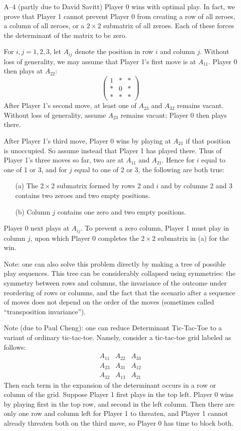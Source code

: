 \documentclass[amssymb,twocolumn,pra,10pt,aps]{revtex4-1}
\begin{document}
\begin{itemize}
\item[A--4]
(partly due to David Savitt)
Player 0 wins with optimal play. In fact, we prove that Player 1 cannot
prevent Player 0 from creating a row of all zeroes, a column of all
zeroes, or a $2 \times 2$ submatrix of all zeroes. Each of these forces
the determinant of the matrix to be zero.

For $i,j=1, 2,3$, let $A_{ij}$ denote the position in row $i$ and
column $j$. Without loss of generality, we may assume that Player
1's first move is at $A_{11}$. Player 0 then plays at $A_{22}$:
\[
\begin{pmatrix}
1 & * & * \\
* & 0 & * \\
* & * & *
\end{pmatrix}
\]
After Player 1's second move, at least one of $A_{23}$ and $A_{32}$
remains vacant. Without loss of generality, assume $A_{23}$ remains
vacant; Player 0 then plays there.

After Player 1's third move, Player 0 wins by playing at $A_{21}$ if that
position is unoccupied. So assume instead that Player 1 has played there.
Thus of Player 1's three moves so far, two are at $A_{11}$ and $A_{21}$.
Hence for $i$ equal to one of 1 or 3, and for $j$ equal to one of 2 or 3,
the following are both true:
\begin{enumerate}
\item[(a)]
The $2 \times 2$ submatrix formed by rows 2 and $i$ and by columns
2 and 3 contains two zeroes and two empty positions.
\item[(b)]
Column $j$ contains one zero and two empty positions.
\end{enumerate}
Player 0 next plays at $A_{ij}$. To prevent a zero column, Player 1
must play in column $j$, upon which Player 0 completes the $2 \times 2$
submatrix in (a) for the win.

Note: one can also solve this problem directly by making a tree of
possible play sequences. This tree can be considerably collapsed
using symmetries: the symmetry between rows and columns, the invariance
of the outcome under reordering of rows or columns, and the fact that
the scenario after a sequence of moves does not depend on the order of
the moves (sometimes called ``transposition invariance'').

Note (due to Paul Cheng):
one can reduce Determinant
Tic-Tac-Toe to a variant of ordinary tic-tac-toe.
Namely, consider a tic-tac-toe grid
labeled as follows:
\[
\begin{array}{c|c|c}
A_{11} & A_{22} & A_{33} \\
\hline
A_{23} & A_{31} & A_{12} \\
\hline
A_{32} & A_{13} & A_{21}
\end{array}
\]
Then each term in the expansion of the determinant occurs in a row
or column of the grid. Suppose Player 1 first plays in the top left.
Player 0 wins by playing first in the top row, and second in the left
column. Then there are only one row and column left for Player 1
to threaten, and Player 1 cannot already threaten both on the third move,
so Player 0 has time to block both.


\end{itemize}
\end{document}
